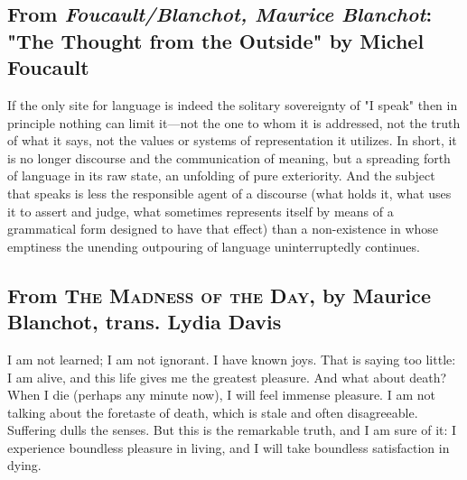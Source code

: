 \documentclass[
]{memoir}
\begin{document}
\hypertarget{from-foucaultblanchot-maurice-blanchot-the-thought-from-the-outside-by-michel-foucault}{%
\subsection*{\texorpdfstring{From \emph{Foucault/Blanchot, Maurice
Blanchot}: "The Thought from the Outside" by Michel
Foucault}{From Foucault/Blanchot, Maurice Blanchot: "The Thought from the Outside" by Michel Foucault}}\label{from-foucaultblanchot-maurice-blanchot-the-thought-from-the-outside-by-michel-foucault}}

If the only site for language is indeed the solitary sovereignty of "I
speak" then in principle nothing can limit it---not the one to whom it
is addressed, not the truth of what it says, not the values or systems
of representation it utilizes. In short, it is no longer discourse and
the communication of meaning, but a spreading forth of language in its
raw state, an unfolding of pure exteriority. And the subject that speaks
is less the responsible agent of a discourse (what holds it, what uses
it to assert and judge, what sometimes represents itself by means of a
grammatical form designed to have that effect) than a non-existence in
whose emptiness the unending outpouring of language uninterruptedly
continues.

\hypertarget{from-the-madness-of-the-day-by-maurice-blanchot-trans.-lydia-davis}{%
\subsection*{\texorpdfstring{From \textsc{The Madness of the Day}, by
Maurice Blanchot, trans. Lydia
Davis}{From The Madness of the Day, by Maurice Blanchot, trans. Lydia Davis}}\label{from-the-madness-of-the-day-by-maurice-blanchot-trans.-lydia-davis}}

I am not learned; I am not ignorant. I have known joys. That is saying
too little: I am alive, and this life gives me the greatest pleasure.
And what about death? When I die (perhaps any minute now), I will feel
immense pleasure. I am not talking about the foretaste of death, which
is stale and often disagreeable. Suffering dulls the senses. But this is
the remarkable truth, and I am sure of it: I experience boundless
pleasure in living, and I will take boundless satisfaction in dying.
\end{document}
